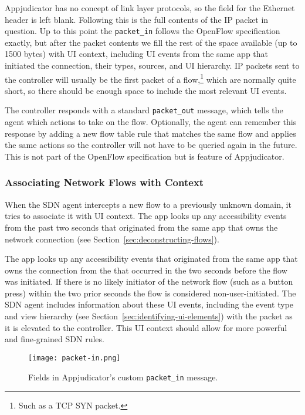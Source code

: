 Appjudicator has no concept of link layer protocols, so the field for the
Ethernet header is left blank. Following this is the full contents of the IP
packet in question. Up to this point the \texttt{packet\_in} follows the
OpenFlow specification exactly, but after the packet contents we fill the rest
of the space available (up to 1500 bytes) with UI context, including UI events
from the same app that initiated the connection, their types, sources, and UI
hierarchy. IP packets sent to the controller will usually be the first packet of
a flow,\footnote{Such as a TCP SYN packet.} which are normally quite short, so
there should be enough space to include the most relevant UI events.

The controller responds with a standard \texttt{packet\_out} message, which
tells the agent which actions to take on the flow. Optionally, the agent can
remember this response by adding a new flow table rule that matches the same
flow and applies the same actions so the controller will not have to be queried
again in the future. This is not part of the OpenFlow specification but is
feature of Appjudicator.

\subsubsection{Associating Network Flows with Context}
\label{sec:associating-network-flows-with-context}

When the SDN agent intercepts a new flow to a previously unknown domain, it
tries to associate it with UI context. The app looks up any accessibility events
from the past two seconds that originated from the same app that owns the
network connection (see Section~\ref{sec:deconstructing-flows}).

The app looks up any accessibility events
that originated from the same app that owns the connection from the that occurred in the two seconds before the flow was initiated. If there is no
likely initiator of the network flow (such as a button press) within the two
prior seconds the flow is considered non-user-initiated. The SDN agent includes
information about these UI events, including the event type and view hierarchy
(see Section~\ref{sec:identifying-ui-elements}) with the packet as it is
elevated to the controller. This UI context should allow for more powerful and
fine-grained SDN rules.

\begin{figure}[p]
	\centering
	\texttt{[image: packet-in.png]}
    \caption{Fields in Appjudicator's custom \texttt{packet\_in} message.}
    \label{fig:packet-in}
\end{figure}

